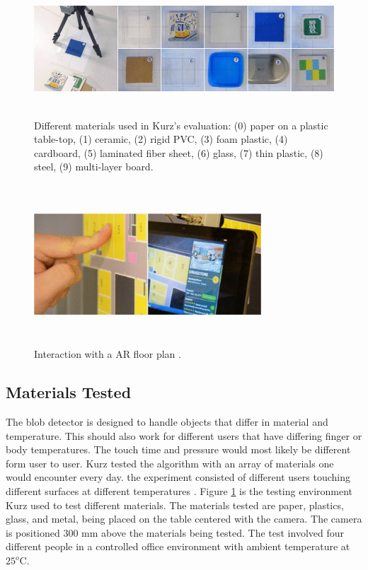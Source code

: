 \documentclass{sig-alternate}
\begin{document}
\begin{figure}
	\includegraphics[width=18cm, height=5cm]{ThermalTesting}
	\caption{Different materials used in Kurz's evaluation: (0) paper on a plastic table-top, (1) ceramic, (2) rigid PVC, (3) foam plastic, (4) cardboard, (5) laminated fiber sheet, (6) glass, (7) thin plastic, (8) steel, (9) multi-layer board. \cite{Thermal}}
	\label{fig:ThermalTest}
\end{figure}

\begin{figure}
	\includegraphics[width=8.5cm, height=6cm]{AugmentedFloorPlans}
	\caption{Interaction with a AR floor plan \cite{Thermal}.}
	\label{fig:FloorPlan}
\end{figure}

\subsection{Materials Tested}
\label{Materials Tested}
The blob detector is designed to handle objects that differ in material and temperature. This should also work for different users that have differing finger or body temperatures. The touch time and pressure would most likely be different form user to user. Kurz tested the algorithm with an array of materials one would encounter every day. the experiment consisted of different users touching different surfaces at different temperatures \cite{3D}. Figure \ref{fig:ThermalTest} is the testing environment Kurz used to test different materials. The materials tested are paper, plastics, glass, and metal, being placed on the table centered with the camera. The camera is positioned 300 mm above the materials being tested. The test involved four different people in a controlled office environment with ambient temperature at \(25^o\)C. 
\end{document}
